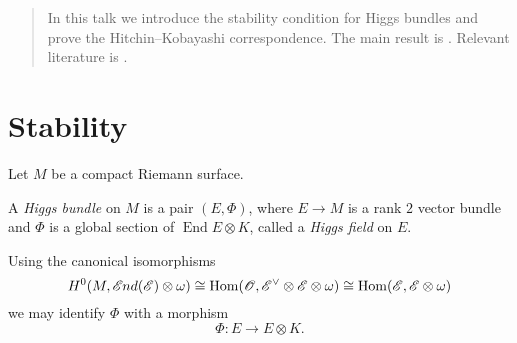 \documentclass[A4paper, 12pt, british, reqno]{amsart}
\DeclareMathOperator{\Hom}{Hom}
\DeclareMathOperator{\End}{End}
\newcommand{\ot}{\otimes}
\newcommand{\dual}{^{\vee}}
\begin{document}
\maketitle

\begin{abstract}
    In this talk we introduce the stability condition for Higgs bundles and prove the Hitchin--Kobayashi correspondence.
    The main result is \cite[Theorem 4.3]{hit87a}.
    Relevant literature is \cite[\S 3 and \S 4]{hit87a}.
\end{abstract}

\tableofcontents

\section{Stability}


%
%
%

Let $M$ be a compact Riemann surface.

\begin{udefn}
    A \textit{Higgs bundle} on $M$ is a pair $(E,\Phi)$, where $E\to M$ is a rank $2$ vector bundle and $\Phi$ is a global section of $\End{E}\ot K$, called a \textit{Higgs field} on $E$.
\end{udefn}

\begin{urem}
    Using the canonical isomorphisms
    \[ H^{0}(M,\sEnd(\E)\ot \w)\cong \Hom(\O,\E\dual \ot \E\ot \w)\cong \Hom(\E,\E\ot \w) \]
    we may identify $\Phi$ with a morphism
    \[ \Phi\colon E\to E\ot K. \]
\end{urem}

\end{document}
